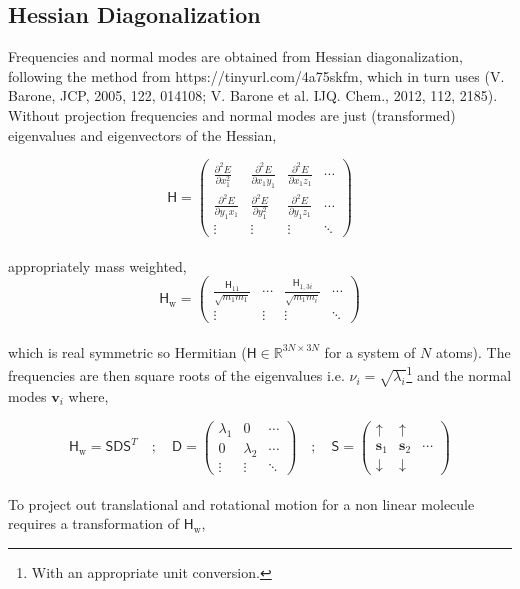 \documentclass[10pt]{article}
\begin{document}
\subsection{Hessian Diagonalization}

Frequencies and normal modes are obtained from Hessian diagonalization, following the method from {\color{blue} https://tinyurl.com/4a75skfm}, which in turn uses (V. Barone, JCP, 2005, 122, 014108; V. Barone et al. IJQ. Chem., 2012, 112, 2185). Without projection frequencies and normal modes are just (transformed) eigenvalues and eigenvectors of the Hessian,

\begin{equation}
	\mathsf{H} = \begin{pmatrix}
		\frac{\partial^2 E}{\partial x_1^2} & \frac{\partial^2 E}{\partial x_1y_1} & 
		\frac{\partial^2 E}{\partial x_1z_1} & \cdots\\
		\frac{\partial^2 E}{\partial y_1x_1} & \frac{\partial^2 E}{\partial y_1^2} & 
		\frac{\partial^2 E}{\partial y_1z_1} & \cdots\\
		\vdots & \vdots & \vdots & \ddots
	\end{pmatrix}
\end{equation}
\\
appropriately mass weighted,
\begin{equation}
	\mathsf{H}_\text{w} = \begin{pmatrix}
		\frac{\mathsf{H}_{11}}{\sqrt{m_1 m_1}} & \cdots & \frac{\mathsf{H}_{1,3i}}{\sqrt{m_1 m_i}} & \cdots \\
		\vdots & \vdots & \vdots & \ddots
	\end{pmatrix}
\end{equation}
\\
which is real symmetric so Hermitian ($\mathsf{H} \in \mathbb{R}^{3N\times3N}$ for a system of $N$ atoms). The frequencies are then square roots of the eigenvalues i.e. $\nu_i = \sqrt{\lambda_i}$\footnote{With an appropriate unit conversion.} and the normal modes $\boldsymbol{v}_i$ where,

\begin{equation}
	\mathsf{H}_\text{w} = \mathsf{S D S}^T \quad ; \quad \mathsf{D} = \begin{pmatrix}
		\lambda_1 & 0  & \cdots \\
		0 & \lambda_2 & \cdots \\
		\vdots & \vdots & \ddots
	\end{pmatrix}
	\quad ; \quad
	\mathsf{S} = \begin{pmatrix}
		\uparrow & \uparrow &  \\
		\boldsymbol{s}_1 & \boldsymbol{s}_2 & \cdots \\
		\downarrow & \downarrow & 
	\end{pmatrix}
\end{equation}
\\
To project out translational and rotational motion for a non linear molecule requires a transformation of $\mathsf{H}_\text{w}$,
\end{document}
